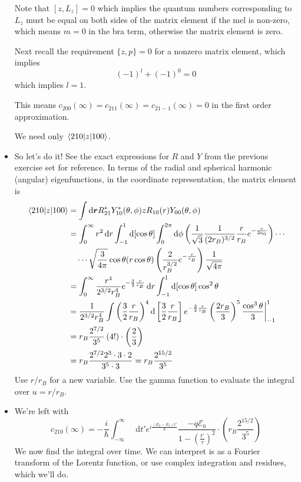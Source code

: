 \documentclass[11pt, a4paper]{article}
\newcommand{\diff}{\mathop{}\!\mathrm{d}} %
\renewcommand{\vec}[1]{\bm{#1}} %
\renewcommand{\r}{\vec{r}}  %
\newcommand{\E}{\mathcal{E}}  %
\begin{document}
\begin{itemize}
	Note that $ [z, L_{z}] = 0 $ which implies the quantum numbers corresponding to $ L_{z} $ must be equal on both sides of the matrix element if the mel is non-zero, which means $ m = 0 $ in the bra term, otherwise the matrix element is zero.
	
	Next recall the requirement $ \{z, p\} = 0 $ for a nonzero matrix element, which implies
	\begin{equation*}
		(-1)^{l} + (-1)^{0} = 0
	\end{equation*}
	which implies $ l = 1 $. 
	
	This means $ c_{200}(\infty) = c_{211}(\infty) = c_{21-1}(\infty) = 0 $ in the first order approximation. 
	
	We need only $ \mel{210}{z}{100} $.
	
	\item So let's do it! See the exact expressions for $ R $ and $ Y $ from the previous exercise set for reference. In terms of the radial and spherical harmonic (angular) eigenfunctions, in the coordinate representation, the matrix element is
	\begin{align*}
		\mel{210}{z}{100} &= \int \diff \r R_{21}^{*}Y_{10}^{*}(\theta, \phi) z R_{10}(r)Y_{00}(\theta, \phi)\\
		& = \int_{0}^{\infty}r^{2}\diff r \int_{-1}^{1}\diff [\cos \theta] \int_{0}^{2\pi} \diff \phi \left(\frac{1}{\sqrt{3}}\frac{1}{(2r_{B})^{3/2}}\frac{r}{r_{B}}e^{-\frac{r}{2a_{0}}}\right)\cdots\\
		&{} \quad \cdots \sqrt{\frac{3}{4\pi}}\cos \theta(r\cos \theta)\left(\frac{2}{r_{B}^{3/2}}e^{-\frac{r}{r_{B}}}\right)\frac{1}{\sqrt{4\pi}}\\
		& = \int_{0}^{\infty}\frac{r^{4}}{2^{3/2}r_{B}^{4}}e^{-\frac{3}{2}\frac{r}{r_{B}}}\diff r\int_{-1}^{1}\diff [\cos \theta] \cos^{2}\theta\\
		& = \frac{1}{2^{3/2}r_{B}^{4}}\int \left(\frac{3}{2}\frac{r}{r_{B}}\right)^{4}\diff \left[\frac{3}{2}\frac{r}{r_{B}}\right]e^{-\frac{3}{2}\frac{r}{r_{B}}}\left(\frac{2r_{B}}{3}\right)^{5} \frac{\cos^{3}\theta}{3}\bigg |_{-1}^{1}\\
		& = r_{B}\frac{2^{7/2}}{3^{5}} \left(4!\right) \cdot \left(\frac{2}{3}\right)\\
		& = r_{B}\frac{2^{7/2}2^{3}\cdot3\cdot2}{3^{5}\cdot3} = r_{B}\frac{2^{15/2}}{3^{5}}
	\end{align*}
	Use $ r/r_{B} $ for a new variable. Use the gamma function to evaluate the integral over $ u = r/r_{B}  $.

	\item We're left with
	\begin{equation*}
		c_{210}(\infty) = - \frac{i}{\hbar}\int_{-\infty}^{\infty} \diff t' e^{i \frac{(E_{2} - E_{1})t'}{\hbar}} \frac{-q\E_{0}}{1 - \left(\frac{t'}{\tau}\right)^{2}} \cdot \left(r_{B}\frac{2^{15/2}}{3^{5}}\right) 
	\end{equation*}
	We now find the integral over time. We can interpret is as a Fourier transform of the Lorentz function, or use complex integration and residues, which we'll do.
	

\end{itemize}
\end{document}
